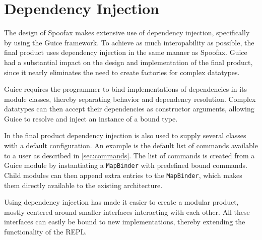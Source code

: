 \section{Dependency Injection}
\label{sec:injection}

The design of Spoofax makes extensive use of dependency injection, specifically
by using the Guice framework.  To achieve as much interopability as possible, the final product
uses dependency injection in the same manner as Spoofax. Guice had a
substantial impact on the design and implementation of the final product, since
it nearly eliminates the need to create factories for complex datatypes.

Guice requires the programmer to bind implementations of dependencies in its
module classes, thereby separating behavior and dependency resolution.  Complex
datatypes can then accept their dependencies as constructor arguments, allowing
Guice to resolve and inject an instance of a bound type.

In the final product dependency injection is also used to supply several classes
with a default configuration.  An example is the default list of commands
available to a user as described in \cref{sec:commands}.  The list of commands
is created from a Guice module by instantiating a \texttt{MapBinder} with
predefined bound commands. Child modules can then append extra entries to the
\texttt{MapBinder}, which makes them directly available to the existing
architecture.

Using dependency injection has made it easier to create a modular product,
mostly centered around smaller interfaces interacting with each other. All these
interfaces can easily be bound to new implementations, thereby extending the
functionality of the REPL.
